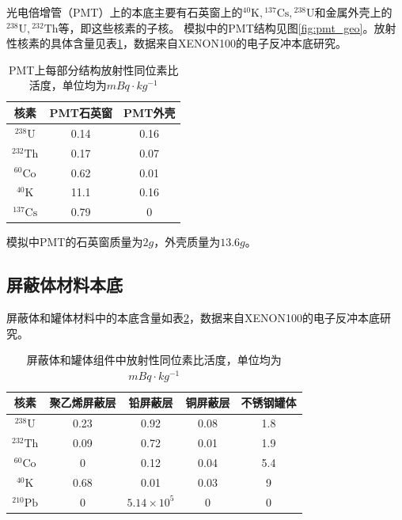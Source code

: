 光电倍增管（PMT）上的本底主要有石英窗上的${}^{40}\mathrm{K},{}^{137}\mathrm{Cs},{}^{238}\mathrm{U}$和金属外壳上的${}^{238}\mathrm{U},{}^{232}\mathrm{Th}$等，即这些核素的子核。
模拟中的PMT结构见图\ref{fig:pmt_geo}。放射性核素的具体含量见表\ref{tab:pmt_radio}，数据来自XENON100的电子反冲本底研究\cite{xenon100_collaboration_study_2013}。

\begin{table}
  \centering
  \caption{PMT上每部分结构放射性同位素比活度，单位均为$\si{mBq\cdot kg^{-1}}$}
  \begin{tabular}{ccc}
    \toprule
    核素 & PMT石英窗 & PMT外壳 \\
    \midrule
    ${}^{238}\mathrm{U}$ & 0.14 & 0.16 \\
    ${}^{232}\mathrm{Th}$ & 0.17 & 0.07 \\
    ${}^{60}\mathrm{Co}$ & 0.62 & 0.01 \\
    ${}^{40}\mathrm{K}$ & 11.1 & 0.16 \\
    ${}^{137}\mathrm{Cs}$ & 0.79 & 0 \\
    \bottomrule
  \end{tabular}
  \label{tab:pmt_radio}
\end{table}

模拟中PMT的石英窗质量为$2\si{g}$，外壳质量为$13.6\si{g}$。

\subsection{屏蔽体材料本底}

屏蔽体和罐体材料中的本底含量如表\ref{tab:shield_radio}，数据来自XENON100的电子反冲本底研究\cite{xenon100_collaboration_study_2013}。

\begin{table}
  \centering
  \caption{屏蔽体和罐体组件中放射性同位素比活度，单位均为$\si{mBq\cdot kg^{-1}}$}
  \begin{tabular}{ccccc}
    \toprule
    核素 & 聚乙烯屏蔽层 & 铅屏蔽层 & 铜屏蔽层 & 不锈钢罐体 \\
    \midrule
    ${}^{238}\mathrm{U}$ & 0.23 & 0.92 & 0.08 & 1.8 \\
    ${}^{232}\mathrm{Th}$ & 0.09 & 0.72 & 0.01 & 1.9 \\
    ${}^{60}\mathrm{Co}$ & 0 & 0.12 & 0.04 & 5.4 \\
    ${}^{40}\mathrm{K}$ & 0.68 & 0.01 & 0.03 & 9 \\
    ${}^{210}\mathrm{Pb}$ & 0 & $5.14\times10^5$ & 0 & 0 \\
    \bottomrule
  \end{tabular}
  \label{tab:shield_radio}
\end{table}

